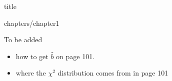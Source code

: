 \documentclass[12pt]{book}
\begin{document}
\frontmatter



{title}

\tableofcontents

\restoregeometry

\mainmatter


{chapters/chapter1}
	

To be added
\begin{itemize}
    \item how to get $\hat b$ on page 101.
    \item where the $\chi^2$ distribution comes from in page 101
\end{itemize}
	

\backmatter
\end{document}
